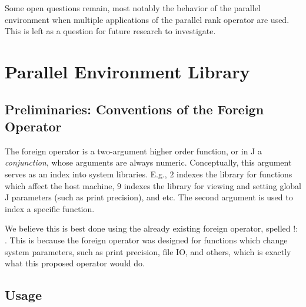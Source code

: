 Some open questions remain, most notably 
the behavior of the parallel environment when multiple applications of the parallel rank operator are used. 
This is left as a question for future research to investigate.

\section{Parallel Environment Library}
\label{pfor}
\subsection{Preliminaries: Conventions of the Foreign Operator}
The foreign operator is a two-argument higher order function, or in J a \textit{conjunction}, 
whose arguments are always numeric.
Conceptually, this argument serves as an index into system libraries.
E.g., $2$ indexes the library for functions which affect the host machine, 
$9$ indexes the library for viewing and setting global J parameters (such as print precision), and etc.
The second argument is used to index a specific function.

We believe this is best done using the already existing foreign operator, spelled $!:$.
This is because the foreign operator was designed for functions which change system parameters, 
such as print precision, file IO, and others,\cite{jvocab} 
which is exactly what this proposed operator would do.


\subsection{Usage}
